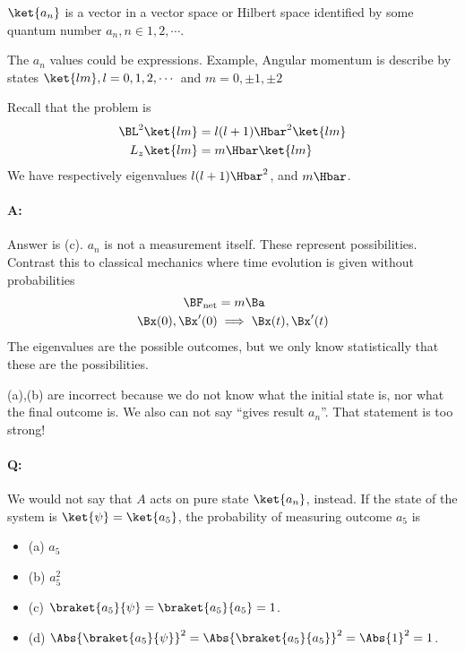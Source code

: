 \(\ket{a_n}\) is a vector in a vector space or Hilbert space identified by some quantum number \(a_n, n \in 1,2, \cdots\).

The \(a_n\) values could be expressions.  Example, Angular momentum is describe by states \(\ket{lm}, l = 0,1,2,\cdots\) and \(m = 0, \pm 1, \pm 2\)

Recall that the problem is
%
\begin{equation}\label{eqn:PHY356HNov2:10}
\begin{aligned}
\BL^2 \ket{lm} &= l(l+1) \Hbar^2 \ket{lm} \\
L_z \ket{lm} &= m \Hbar \ket{lm}
\end{aligned}
\end{equation}
%
We have respectively eigenvalues \(l(l+1)\Hbar^2\), and \(m \Hbar\).

\paragraph{A:} Answer is (c).  \(a_n\) is not a measurement itself.  These represent possibilities.  Contrast this to classical mechanics where time evolution is given without probabilities
%
\begin{equation}\label{eqn:PHY356HNov2:20}
\begin{aligned}
\BF_{\text{net}} &= m \Ba \\
\Bx(0), \Bx'(0) &\implies \Bx(t), \Bx'(t)
\end{aligned}
\end{equation}
%
The eigenvalues are the possible outcomes, but we only know statistically that these are the possibilities.

(a),(b) are incorrect because we do not know what the initial state is, nor what the final outcome is.  We also can not say ``gives result \(a_n\)''.  That statement is too strong!

\paragraph{Q:} We would not say that \(A\) acts on pure state \(\ket{a_n}\), instead.  If the state of the system is \(\ket{\psi} = \ket{a_5}\), the probability of measuring outcome \(a_5\) is
\begin{itemize}
\item (a) \(a_5\)
\item (b) \(a_5^2\)
\item (c) \(\braket{a_5}{\psi} = \braket{a_5}{a_5} = 1\).
\item (d) \(\Abs{\braket{a_5}{\psi}}^2 = \Abs{\braket{a_5}{a_5}}^2 = \Abs{1}^2 = 1\).
\end{itemize}

